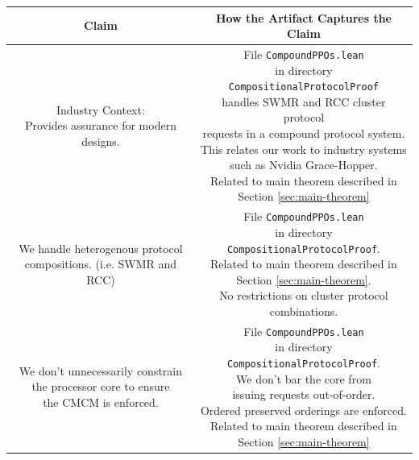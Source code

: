 \begin{center}
\begin{tabular}{ | c | c | }
  \hline
    Claim  & How the Artifact Captures the Claim
    \\ 
  \hline \hline
    \makecell{
      Industry Context: \\
      Provides assurance for modern designs.
    }
    &
    \makecell{
      File \texttt{CompoundPPOs.lean}\\
      in directory \texttt{CompositionalProtocolProof}\\
      handles SWMR and RCC cluster protocol\\
      requests in a compound protocol system.\\
      This relates our work to industry systems\\
      such as Nvidia Grace-Hopper.\\
      Related to main theorem described in\\
      Section \ref{sec:main-theorem}
    }
    \\  
  \hline
    \makecell{
      We handle heterogenous protocol\\
      compositions. (i.e. SWMR and RCC)
    }
    &
    \makecell{
      File \texttt{CompoundPPOs.lean}\\
      in directory \texttt{CompositionalProtocolProof}.\\
      Related to main theorem described in\\
      Section \ref{sec:main-theorem}.\\
      No restrictions on cluster protocol\\
      combinations.
    }
    \\  
  \hline
    \makecell{
      We don't unnecessarily constrain \\
      the processor core to ensure \\
      the CMCM is enforced.
    }
    &
    \makecell{
      File \texttt{CompoundPPOs.lean}\\
      in directory \texttt{CompositionalProtocolProof}.\\
      We don't bar the core from \\
      issuing requests out-of-order. \\
      Ordered preserved orderings are enforced.\\
      Related to main theorem described in\\
      Section \ref{sec:main-theorem}
    }
    \\  
  \hline
\end{tabular}
\end{center}

